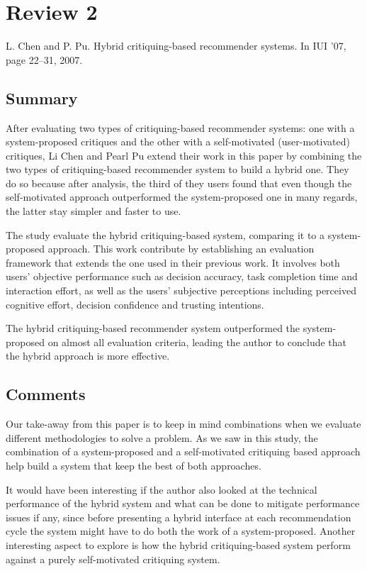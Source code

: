 \documentclass{article}
\begin{document}
\section*{Review 2}
L. Chen and P. Pu. Hybrid critiquing-based recommender systems. 
In IUI ’07, page 22–31, 2007.

\subsection*{Summary}

After evaluating two types of critiquing-based recommender systems: one with
a system-proposed critiques and the other with a self-motivated 
(user-motivated) critiques, Li Chen and Pearl Pu extend their work in this
paper by combining the two types of critiquing-based recommender system to
build a hybrid one. They do so because after analysis, the third of they users
found that even though the self-motivated approach outperformed the
system-proposed one in many regards, the latter stay simpler and faster to use.

The study evaluate the hybrid critiquing-based system, comparing it to a
system-proposed approach. This work contribute by establishing an evaluation
framework that extends the one used in their previous work. It involves both
users’ objective performance such as decision accuracy, task completion time
and interaction effort, as well as the users’ subjective perceptions including
perceived cognitive effort, decision confidence and trusting intentions.

The hybrid critiquing-based recommender system outperformed the system-proposed
on almost all evaluation criteria, leading the author to conclude that the
hybrid approach is more effective.


\subsection*{Comments}

Our take-away from this paper is to keep in mind combinations when we evaluate
different methodologies to solve a problem. As we saw in this study, the
combination of a system-proposed and a self-motivated critiquing based approach
help build a system that keep the best of both approaches. 

It would have been interesting if the author also looked at the technical
performance of the hybrid system and what can be done to mitigate performance
issues if any, since before presenting a hybrid interface at each
recommendation cycle the system might have to do both the work of a
system-proposed. Another interesting aspect to explore is how the hybrid
critiquing-based system perform against a purely self-motivated critiquing
system.
\end{document}
